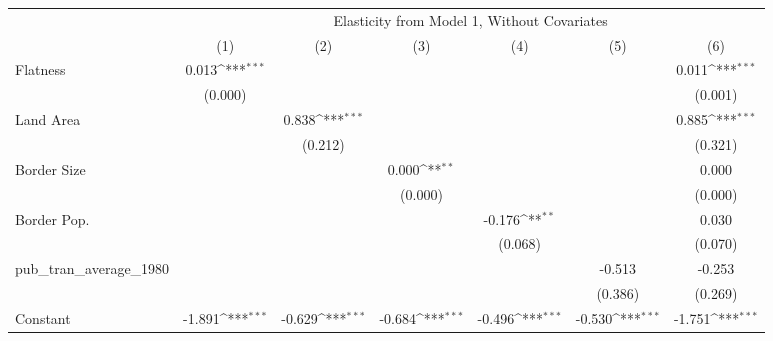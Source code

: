 {
\def\sym#1{\ifmmode^{#1}\else\(^{#1}\)\fi}
\begin{tabular}{l*{6}{c}}
\hline\hline
            &\multicolumn{6}{c}{Elasticity from Model 1, Without Covariates}                                                                    \\
            &\multicolumn{1}{c}{(1)}         &\multicolumn{1}{c}{(2)}         &\multicolumn{1}{c}{(3)}         &\multicolumn{1}{c}{(4)}         &\multicolumn{1}{c}{(5)}         &\multicolumn{1}{c}{(6)}         \\
\hline
Flatness    &       0.013\sym{***}&                     &                     &                     &                     &       0.011\sym{***}\\
            &     (0.000)         &                     &                     &                     &                     &     (0.001)         \\
[1em]
Land Area   &                     &       0.838\sym{***}&                     &                     &                     &       0.885\sym{***}\\
            &                     &     (0.212)         &                     &                     &                     &     (0.321)         \\
[1em]
Border Size &                     &                     &       0.000\sym{**} &                     &                     &       0.000         \\
            &                     &                     &     (0.000)         &                     &                     &     (0.000)         \\
[1em]
Border Pop. &                     &                     &                     &      -0.176\sym{**} &                     &       0.030         \\
            &                     &                     &                     &     (0.068)         &                     &     (0.070)         \\
[1em]
pub\_tran\_average\_1980&                     &                     &                     &                     &      -0.513         &      -0.253         \\
            &                     &                     &                     &                     &     (0.386)         &     (0.269)         \\
[1em]
Constant    &      -1.891\sym{***}&      -0.629\sym{***}&      -0.684\sym{***}&      -0.496\sym{***}&      -0.530\sym{***}&      -1.751\sym{***}\\

\end{tabular}}
